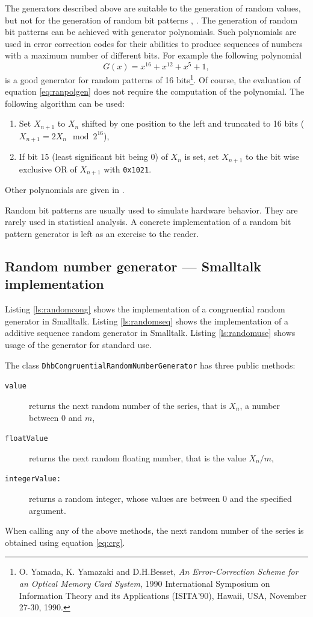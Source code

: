  The generators described above
are suitable to the generation of random values, but not for the
generation of random bit patterns \cite{Knuth2}, \cite{Press}. The
generation of random bit patterns can be achieved with generator
polynomials. Such polynomials are used in error correction codes
for their abilities to produce sequences of numbers with a maximum
number of different bits. For example the following polynomial
\begin{equation}
\label{eq:ranpolgen}
  G\left(x\right) = x^{16} + x^{12} +x^5 + 1,
\end{equation}
is a good generator for random patterns of 16 bits\footnote{\cf O.
Yamada, K. Yamazaki and D.H.Besset, {\em An Error-Correction
Scheme for an Optical Memory Card System}, 1990 International
Symposium on Information Theory and its Applications (ISITA'90),
Hawaii, USA, November 27-30, 1990.}. Of course, the evaluation of
equation \ref{eq:ranpolgen} does not require the computation of
the polynomial. The following algorithm can be used: {\parskip 0pt
\begin{enumerate}
  \item Set $X_{n+1}$ to $X_n$ shifted by one position to the left
  and truncated to 16 bits ($X_{n+1}=2X_n \mod 2^{16}$),
  \item If bit 15 (least significant bit being 0) of $X_n$ is set,
  set $X_{n+1}$ to the bit wise exclusive OR of $X_{n+1}$ with
  {\tt 0x1021}.
\end{enumerate}}
\noindent Other polynomials are given in \cite{Press}.

Random bit patterns are usually used to simulate hardware
behavior. They are rarely used in statistical analysis. A concrete
implementation of a random bit pattern generator is left as an
exercise to the reader.

\subsection{Random number generator --- Smalltalk implementation}
 Listing \ref{ls:randomcong} shows
the implementation of a congruential random generator in
Smalltalk. Listing \ref{ls:randomseq} shows the implementation of
a additive sequence random generator in Smalltalk. Listing
\ref{ls:randomuse} shows usage of the generator for standard use.

\noindent The class {\tt DhbCongruentialRandomNumberGenerator} has
three public methods:
\begin{description}
  \item[\tt value] returns the next random number of the series,
  that is $X_n$, a number between $0$ and $m$,
  \item[\tt floatValue] returns the next random floating number,
  that is the value $X_n / m$,
  \item[\tt integerValue:] returns a random integer, whose values
  are between 0 and the specified argument.
\end{description}
When calling any of the above methods, the next random number of
the series is obtained using equation \ref{eq:crg}.

